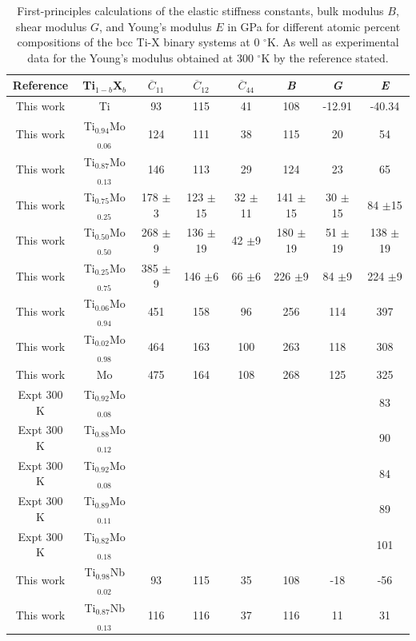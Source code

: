 \newpage
\begin{longtable}[H]{ c c c c c c c c}
	\caption{First-principles calculations of the elastic stiffness constants, bulk modulus $B$, shear modulus $G$, and Young's modulus $E$ in GPa for different atomic percent compositions of the bcc Ti-X binary systems at 0 $^\circ$K. As well as experimental data for the Young's modulus obtained at 300 $^\circ$K by the reference stated.} 	\label{Ch5-table:tixelasdata} \\
	\hline
	Reference & Ti$_{1-b}$X$_b$ & $\overline{C}_{11}$ & $\overline{C}_{12}$ & $\overline{C}_{44}$ & \textit{B} & \textit{G} & \textit{E}\\
	\hline
	\endhead
	\hline
	\endfoot
	This work & Ti & 93 & 115 & 41 & 108 & -12.91 & -40.34\\
	This work & Ti$_{0.94}$Mo$_{0.06}$ & 124 & 111 & 38 & 115 & 20 & 54\\
	This work & Ti$_{0.87}$Mo$_{0.13}$ & 146 & 113 & 29 & 124 & 23 & 65\\
	This work & Ti$_{0.75}$Mo$_{0.25}$ & 178 $\pm$3 & 123 $\pm$15 & 32 $\pm$11 & 141 $\pm$15 & 30 $\pm$15 & 84 $\pm$15\\
	This work & Ti$_{0.50}$Mo$_{0.50}$ & 268 $\pm$9 & 136 $\pm$19 & 42 $\pm$9 & 180 $\pm$19 & 51 $\pm$19 & 138 $\pm$19\\
	This work & Ti$_{0.25}$Mo$_{0.75}$ & 385 $\pm$9 & 146 $\pm$6 & 66 $\pm$6 & 226 $\pm$9 & 84 $\pm$9 & 224 $\pm$9\\
	This work & Ti$_{0.06}$Mo$_{0.94}$ & 451 & 158 & 96 & 256 & 114 & 397\\
	This work & Ti$_{0.02}$Mo$_{0.98}$ & 464 & 163 & 100 & 263 & 118 & 308\\
	This work & Mo & 475 & 164 & 108 & 268 & 125 & 325\\
	Expt 300 K \cite{Zhang2015} & Ti$_{0.92}$Mo$_{0.08}$ & & & & & & 83\\
	Expt 300 K \cite{Zhang2015} & Ti$_{0.88}$Mo$_{0.12}$ & & & & & & 90\\
	Expt 300 K \cite{Boyer1994} & Ti$_{0.92}$Mo$_{0.08}$ & & & & & & 84\\
	Expt 300 K \cite{Boyer1994} & Ti$_{0.89}$Mo$_{0.11}$ & & & & & & 89\\
	Expt 300 K \cite{Boyer1994} & Ti$_{0.82}$Mo$_{0.18}$ & & & & & & 101\\
	This work & Ti$_{0.98}$Nb$_{0.02}$ & 93 & 115 & 35 & 108 & -18 & -56\\
	This work & Ti$_{0.87}$Nb$_{0.13}$ & 116 & 116 & 37 & 116 & 11 & 31\\

\end{longtable}
